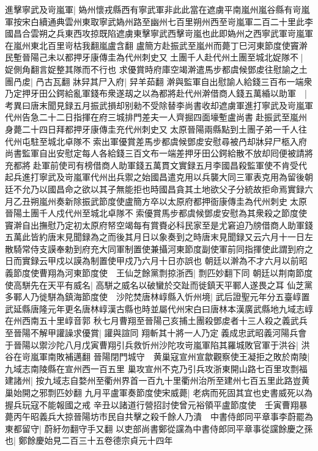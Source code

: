 進擊寧武及岢嵐軍|{
	媯州懷戎縣西有寧武軍非此此當在遮虜平南嵐州嵐谷縣有岢嵐軍按宋白續通典雲州東取寧武媯州路至幽州七百里朔州西至岢嵐軍二百二十里此李國昌合雲朔之兵東西攻掠既陷遮虜東擊寧武西擊岢嵐也此即媯州之西寧武軍岢嵐軍在嵐州東北百里岢枯我翻嵐盧含翻}
盧簡方赴振武至嵐州而薨丁巳河東節度使竇澣民塹晉陽己未以都押牙康傳圭為代州刺史又土團千人赴代州土團至城北娖隊不|{
	娖側角翻言娖整其隊而不行也}
求優賞時府庫空竭澣遣馬步都虞候鄧䖍往慰諭之土團冎䖍|{
	冎古瓦翻}
牀舁其尸入府|{
	舁羊茹翻}
澣與監軍自出慰諭人給錢三百布一端衆乃定押牙田公鍔給亂軍錢布衆遂刼之以為都將赴代州澣借商人錢五萬緍以助軍　|{
	考異曰唐末聞見録五月振武損却别勑不受除替李尚書收却遮虜軍進打寧武及岢嵐軍代州告急二十二日指揮在府三城排門差夫一人齊掘四面壕塹盧尚書赴振武至嵐州身薨二十四日拜都押牙康傳圭充代州刺史又太原晉陽兩縣點到土團子弟一千人往代州屯駐至城北卓隊不索出軍優賞差馬步都虞候鄧䖍安慰尋被冎却牀舁尸柩入府尚書監軍自出安慰定每人各給錢三百文布一端差押牙田公鍔給散不放却囘便被請將充都將赴軍前使司有榜借商人助軍錢五萬貫文實録五月李國昌殺監軍使不肯受代起兵進打寧武及岢嵐軍代州出兵禦之始國昌遣克用以兵襲大同三軍表克用為留後朝廷不允乃以國昌命之欲以其子無能拒也時國昌貪其土地欲父子分統故拒命焉實録六月乙丑朔嵐州奏新除振武節度使盧簡方卒以太原府都押衙康傳圭為代州刺史太原晉陽土團千人戍代州至城北卓隊不索優賞馬步都虞候鄧䖍安慰為其衆殺之節度使竇澣自出撫慰乃定初太原府帑空竭每有賞賚必科民家至是尤窘迫乃牓借商人助軍錢五萬此皆約唐末見聞録為之而後其月日以象奏到之時唐末見聞録又云六月十一日左散騎常侍支謨奉勅到府充大同軍制置使兼攝河東節度副使軍前同指揮使此謂到府之日而實録云甲戍以謨為制置使甲戍乃六月十日亦誤也}
朝廷以澣為不才六月以前昭義節度使曹翔為河東節度使　王仙芝餘黨剽掠浙西|{
	剽匹妙翻下同}
朝廷以荆南節度使高駢先在天平有威名|{
	高駢之威名以破蠻於交趾而徙鎮天平鄆人遂畏之耳}
仙芝黨多鄆人乃徙駢為鎮海節度使　沙陀焚唐林崞縣入忻州境|{
	武后證聖元年分五臺崞置武延縣唐隆元年更名唐林崞漢古縣也時並屬代州宋白曰唐林本漢廣武縣地九域志崞在州西南五十里崞音郭}
秋七月曹翔至晉陽己亥捕土團殺鄧䖍者十三人殺之義武兵至晉陽不解甲讙譟求優賞|{
	讙與諠同}
翔斬其十將一人乃定義成忠武昭義河陽兵會于晉陽以禦沙陀八月戊寅曹翔引兵救忻州沙陀攻岢嵐軍陷其羅城敗官軍于洪谷|{
	洪谷在岢嵐軍南敗補邁翻}
晉陽閉門城守　黄巢寇宣州宣歙觀察使王凝拒之敗於南陵|{
	九域志南陵縣在宣州西一百五里}
巢攻宣州不克乃引兵攻浙東開山路七百里攻剽福建諸州|{
	按九域志自婺州至衢州界首一百九十里衢州治所至建州七百五里此路豈黄巢始開之邪剽匹妙翻}
九月平盧軍奏節度使宋威薨|{
	老病而死固其宜也史書威死以為握兵玩寇不能報國之戒}
辛丑以諸道行營招討使曾元裕領平盧節度使　壬寅曹翔暴薨丙午昭義兵大掠晉陽坊市民自共擊之殺千餘人乃潰　中書侍郎同平章事李蔚罷為東都留守|{
	蔚紆勿翻守手又翻}
以吏部尚書鄭從讜為中書侍郎同平章事從讜餘慶之孫也|{
	鄭餘慶始見二百三十五卷德宗貞元十四年}
